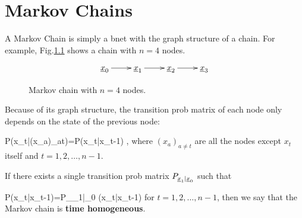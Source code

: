 \chapter{Markov Chains}

A Markov Chain is simply
a bnet with the graph structure 
of a chain. For example,
Fig.\ref{fig-mchain}
shows a chain with $n=4$ nodes.

\begin{figure}[h!]
\centering
$$\xymatrix{
\rvx_0\ar[r]
&\rvx_1\ar[r]
&\rvx_2\ar[r]
&\rvx_3
}$$
\caption{Markov chain with $n=4$ nodes.}
\label{fig-mchain}
\end{figure}

Because of its
 graph structure,
the transition prob matrix of each node
only depends on the state of the previous 
node:

\beq
P(x_t|(x_a)_{a\neq t})=P(x_t|x_{t-1})
\;,
\eeq
where $(x_a)_{a\neq t}$ are all
 the nodes except $x_t$ itself and
$t=1, 2, \dots, n-1$.

If there
exists a single
transition prob matrix $P_{{\underline{x}}_1|{\underline{x}}_0}$
such that

\beq
P(x_t|x_{t-1})=P_{\rvx_1|\rvx_0}
(x_t|x_{t-1})
\;
\eeq
for $t=1, 2,\dots, n-1$, 
then
we say 
that the Markov chain
is {\bf time homogeneous}.
